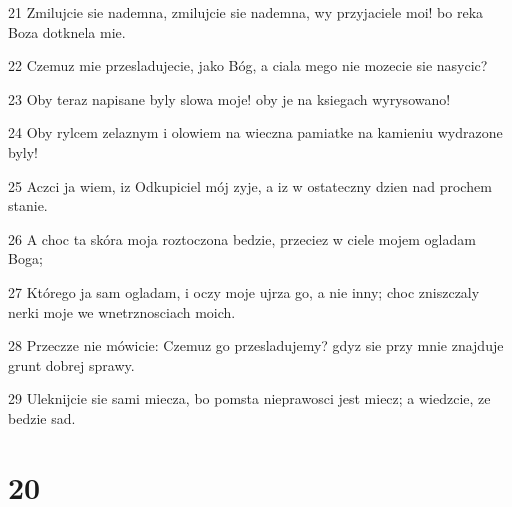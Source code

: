 \par 21 Zmilujcie sie nademna, zmilujcie sie nademna, wy przyjaciele moi! bo reka Boza dotknela mie.
\par 22 Czemuz mie przesladujecie, jako Bóg, a ciala mego nie mozecie sie nasycic?
\par 23 Oby teraz napisane byly slowa moje! oby je na ksiegach wyrysowano!
\par 24 Oby rylcem zelaznym i olowiem na wieczna pamiatke na kamieniu wydrazone byly!
\par 25 Aczci ja wiem, iz Odkupiciel mój zyje, a iz w ostateczny dzien nad prochem stanie.
\par 26 A choc ta skóra moja roztoczona bedzie, przeciez w ciele mojem ogladam Boga;
\par 27 Którego ja sam ogladam, i oczy moje ujrza go, a nie inny; choc zniszczaly nerki moje we wnetrznosciach moich.
\par 28 Przeczze nie mówicie: Czemuz go przesladujemy? gdyz sie przy mnie znajduje grunt dobrej sprawy.
\par 29 Uleknijcie sie sami miecza, bo pomsta nieprawosci jest miecz; a wiedzcie, ze bedzie sad.

\chapter{20}

